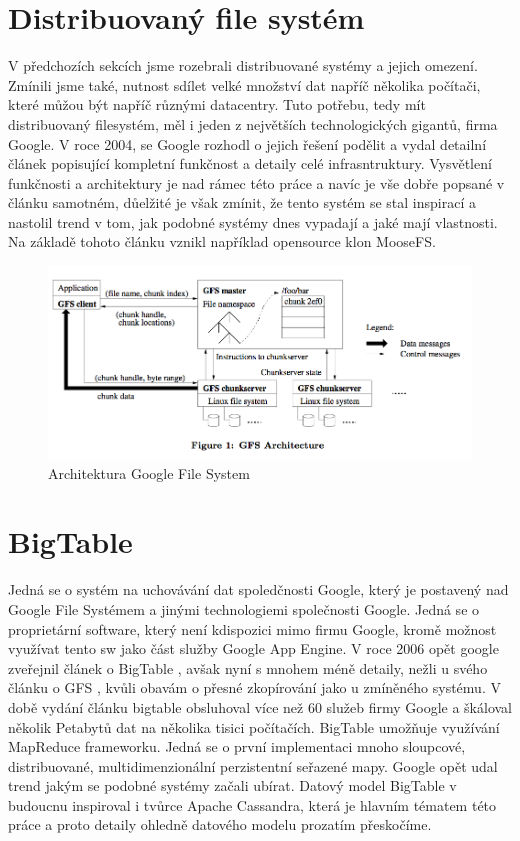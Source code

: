 \documentclass[thesis=M,czech]{FITthesis}[2012/06/26]
\begin{document}
\section{Distribuovaný file systém}

V předchozích sekcích jsme rozebrali distribuované systémy a jejich omezení. Zmínili jsme také, nutnost sdílet velké množství dat napříč několika počítači, které můžou být napříč různými datacentry. Tuto potřebu, tedy mít distribuovaný filesystém, měl i jeden z největších technologických gigantů, firma Google. V roce 2004, se Google rozhodl o jejich řešení podělit a vydal detailní článek \cite{gfs} popisující kompletní funkčnost a detaily celé infrasntruktury. Vysvětlení funkčnosti a  architektury je nad rámec této práce a navíc je vše dobře popsané v článku samotném, důelžité je však zmínit, že tento systém se stal inspirací a nastolil trend v tom, jak podobné systémy dnes vypadají a jaké mají vlastnosti. Na základě tohoto článku vznikl například opensource klon MooseFS.

\begin{figure}[h]
\centering
\includegraphics[scale=0.5]{images/gfs}
\caption{Architektura Google File System \cite{gfs}}
\label{fig:3v}
\end{figure}

\section{BigTable}
Jedná se o systém na uchovávání dat spoledčnosti Google, který je postavený nad Google File Systémem a jinými technologiemi společnosti Google. Jedná se o proprietární software, který není kdispozici mimo firmu Google, kromě možnost využívat tento sw jako část služby Google App Engine.  V roce 2006 opět google zveřejnil článek o BigTable \cite{bigtable}, avšak nyní s mnohem méně detaily, nežli u svého článku o GFS \cite{gfs}, kvůli obavám o přesné zkopírování jako u zmíněného systému. V době vydání článku bigtable obsluhoval více než 60 služeb firmy Google a škáloval několik Petabytů dat na několika tisici počítačích. BigTable umožňuje využívání MapReduce frameworku. Jedná se o první implementaci mnoho sloupcové, distribuované, multidimenzionální perzistentní seřazené mapy.  Google opět udal trend jakým se podobné systémy začali ubírat. Datový model BigTable v budoucnu inspiroval i tvůrce Apache Cassandra, která je hlavním tématem této práce a proto detaily ohledně datového modelu prozatím přeskočíme.
\end{document}

